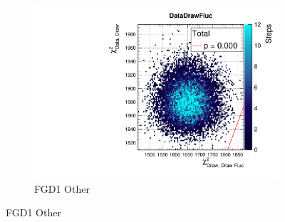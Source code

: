 \begin{figure}[h]
\begin{subfigure}[t]{0.32\textwidth}
		\includegraphics[width=\textwidth, trim={20mm 6mm 4mm 11mm}, clip,page=23]{figures/mach3/data/postpred/2017b_NewData_NewDet_UpdXsecStep_2Xsec_4Det_5Flux_0_PostPred_procs}
		\caption{FGD1 Other}
	\end{subfigure}


\end{figure}
